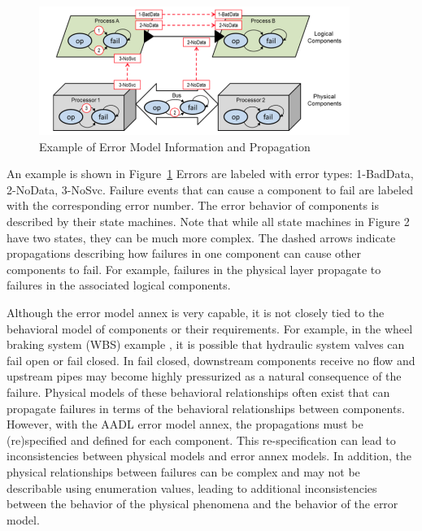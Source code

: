 \begin{figure}
  \centering
 \includegraphics[width=0.9\textwidth]{images/error_annex.png}
  \vspace{-0.1in}
  \caption{Example of Error Model Information and Propagation}
  \label{fig:error_annex}
\end{figure}

An example is shown in Figure~\ref{fig:error_annex}
Errors are labeled with error types: 1-BadData, 2-NoData, 3-NoSvc. Failure events that can cause a component to fail are labeled with the corresponding error number. The error behavior of components is described by their state machines. Note that while all state machines in Figure 2 have two states, they can be much more complex. The dashed arrows indicate propagations describing how failures in one component can cause other components to fail. For example, failures in the physical layer propagate to failures in the associated logical components.

Although the error model annex is very capable, it is not closely tied to the behavioral model of components or their requirements. For example, in the wheel braking system (WBS) example \cite{SAE:ARP4761}, it is possible that hydraulic system valves can fail open or fail closed. In fail closed, downstream components receive no flow and upstream pipes may become highly pressurized as a natural consequence of the failure. Physical models of these behavioral relationships often exist that can propagate failures in terms of the behavioral relationships between components. However, with the AADL error model annex, the propagations must be (re)specified and defined for each component. %
This re-specification can lead to inconsistencies between physical models and error annex models. In addition, the physical relationships between failures can be complex and may not be describable using enumeration values, leading to additional inconsistencies between the behavior of the physical phenomena and the behavior of the error model.

